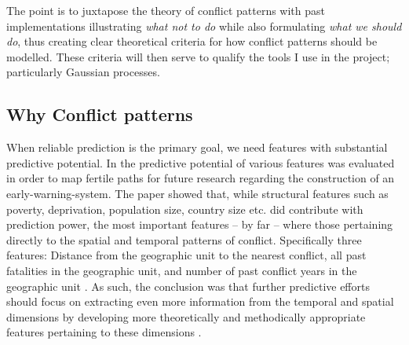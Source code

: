 \documentclass[a4paper]{article}
\begin{document}
The point is to juxtapose the theory of conflict patterns with past implementations illustrating \emph{what not to do} while also formulating \emph{what we should do}, thus creating clear theoretical criteria for how conflict patterns should be modelled. These criteria will then serve to qualify the tools I use in the project; particularly Gaussian processes.\par 



\subsection{Why Conflict patterns}

When reliable prediction is the primary goal, we need features with substantial predictive potential. In \cite{Maase} the predictive potential of various features was evaluated in order to map fertile paths for future research regarding the construction of an early-warning-system. The paper showed that, while structural features such as poverty, deprivation, population size, country size etc. did contribute with prediction power, the most important features -- by far -- where those pertaining directly to the spatial and temporal patterns of conflict. Specifically three features: Distance from the geographic unit to the nearest conflict, all past fatalities in the geographic unit, and number of past conflict years in the geographic unit \citep[17-18]{Maase}. As such, the conclusion was that further predictive efforts should focus on extracting even more information from the temporal and spatial dimensions by developing more theoretically and methodically appropriate features pertaining to these dimensions \citep[21-23]{Maase}.\par
\end{document}
